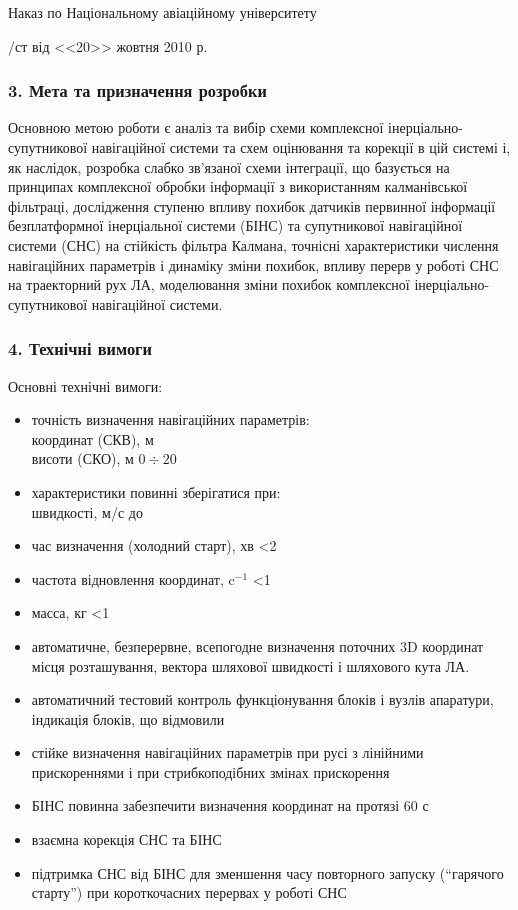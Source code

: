 \documentclass[ukrainian,utf8,simple,floatsingle,hpadding=5mm]{eskdtext}
\begin{document}
Наказ по Національному авіаційному університету

/ст від <<20>> жовтня 2010 р.

\subsubsection*{3. Мета та призначення розробки}

Основною метою роботи є аналіз та вибір схеми комплексної інерціально-супутникової 
навігаційної системи та схем оцінювання та корекції в цій системі і, як наслідок, 
розробка слабко зв’язаної схеми інтеграції, що базується на принципах комплексної 
обробки інформації з використанням калманівської фільтраці, дослідження ступеню 
впливу похибок датчиків первинної інформації  безплатформної інерціальної системи 
(БІНС) та супутникової навігаційної системи (СНС) на стійкість фільтра Калмана, 
точнісні характеристики числення навігаційних параметрів і динаміку зміни похибок, 
впливу перерв у роботі СНС на траекторний рух ЛА, моделювання зміни похибок 
комплексної інерціально-супутникової навігаційної системи.

\subsubsection*{4. Технічні вимоги}

Основні технічні вимоги:
\begin{itemize}
      \item точність визначення навігаційних параметрів:\\
  координат (СКВ), м \\
  висоти (СКО), м \dotfill $0\div20$
     \item характеристики повинні зберігатися при:\\
швидкості, м/с до 
     \item час визначення (холодний старт), хв \dotfill <2
     \item частота відновлення координат, c$^{-1}$ \dotfill <1
     \item масса, кг \dotfill <1
     \item автоматичне, безперервне, всепогодне визначення 
поточних 3D координат місця розташування, вектора шляхової 
швидкості і шляхового кута ЛА.
    \item автоматичний тестовий контроль функціонування блоків і 
вузлів апаратури, індикація блоків, що відмовили
    \item стійке визначення навігаційних параметрів при русі з 
лінійними прискореннями і при стрибкоподібних змінах прискорення
    \item БІНС повинна забезпечити визначення координат на протязі 60 с
    \item взаємна корекція СНС та БІНС
    \item підтримка СНС від БІНС для зменшення часу повторного 
запуску (“гарячого старту”) при короткочасних перервах у роботі СНС
\end{itemize}
\end{document}
